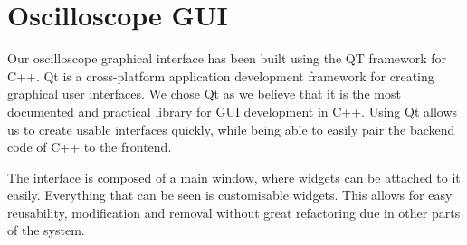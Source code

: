 \section{Oscilloscope GUI}
    Our oscilloscope graphical interface has been built using the QT framework for C++. Qt is a cross-platform application development framework for creating graphical user interfaces. \cite{qt-w} 
    We chose Qt as we believe that it is the most documented and practical library for GUI development in C++. Using Qt allows us to create usable interfaces quickly, while being able to easily pair the backend code of C++ to the frontend.

    The interface is composed of a main window, where widgets can be attached to it easily. Everything that can be seen is customisable widgets. This allows for easy reusability, modification and removal without great refactoring due in other parts of the system.

